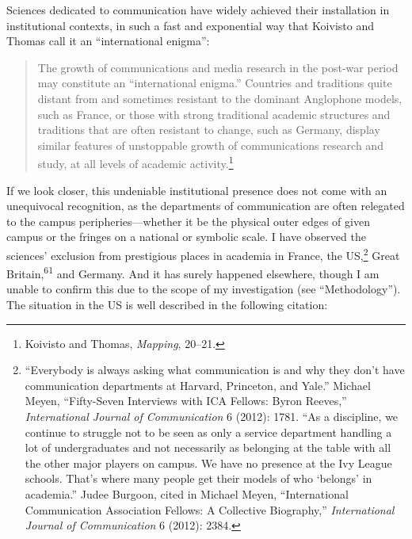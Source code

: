 \documentclass{tufte-handout}
\begin{document}
Sciences dedicated to communication have widely achieved their
installation in institutional contexts, in such a fast and exponential
way that Koivisto and Thomas call it an ``international enigma'':

\begin{quote}
The growth of communications and media research in the post-war period
may constitute an ``international enigma.'' Countries and traditions
quite distant from and sometimes resistant to the dominant Anglophone
models, such as France, or those with strong traditional academic
structures and traditions that are often resistant to change, such as
Germany, display similar features of unstoppable growth of
communications research and study, at all levels of academic
activity.\footnote{Koivisto and Thomas, \emph{Mapping}, 20--21.}
\end{quote}

 \enlargethispage{-\baselineskip}
 
If we look closer, this undeniable institutional presence does not come
with an unequivocal recognition, as the departments of communication are
often relegated to the campus peripheries---whether it be the physical
outer edges of given campus or the fringes on a national or symbolic
scale. I have observed the sciences' exclusion from prestigious places
in academia in France, the US,\footnote{``Everybody is always asking
  what communication is and why they don't have communication
  departments at Harvard, Princeton, and Yale.'' Michael Meyen,
  ``Fifty-Seven Interviews with ICA Fellows: Byron Reeves,''
  \emph{International Journal of Communication} 6 (2012): 1781. ``As a
  discipline, we continue to struggle not to be seen as only a service
  department handling a lot of undergraduates and not necessarily as
  belonging at the table with all the other major players on campus. We
  have no presence at the Ivy League schools. That's where many people
  get their models of who `belongs' in academia.'' Judee Burgoon, cited
  in Michael Meyen, ``International Communication Association Fellows: A
  Collective Biography,'' \emph{International Journal of Communication}
  6 (2012): 2384.} Great Britain,\textsuperscript{61} and Germany. And it has surely happened
elsewhere, though I am unable to confirm this due to the scope of my
investigation (see ``Methodology''). The situation in the US is well
described in the following citation:
\end{document}
